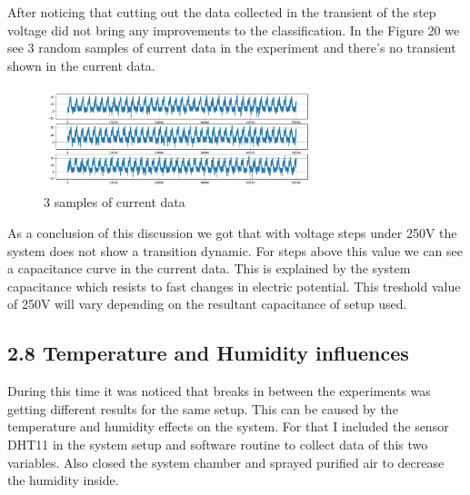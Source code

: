     After noticing that cutting out the data collected in the transient of the step voltage did not bring any improvements to the classification.
    In the Figure 20 we see 3 random samples of current data in the experiment and there's no transient shown in the current data.

    \begin{figure}[H]
        \center
        \includegraphics[width=8cm]{images/random_samples.png}
        \caption{ 3 samples of current data }
    \end{figure}

    As a conclusion of this discussion we got that with voltage steps under 250V the system does not show a transition dynamic. 
    For steps above this value we can see a capacitance curve in the current data. This is explained by the system capacitance which resists to fast changes in electric potential.
    This treshold value of 250V will vary depending on the resultant capacitance of setup used.


\subsection*{2.8 Temperature and Humidity influences}

    During this time it was noticed that breaks in between the experiments was getting different results for the same setup. This can be caused by the temperature and humidity effects on the system.
    For that I included the sensor DHT11 in the system setup and software routine to collect data of this two variables. Also closed the system chamber and sprayed purified air to decrease the humidity inside.
    

